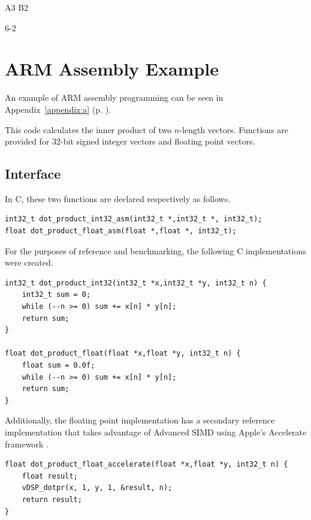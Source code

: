 \documentclass[oneside,a4paper]{report}
\begin{document}
A3
B2

6-2
\chapter{ARM Assembly Example}
An example of ARM assembly programming can be seen in Appendix~\ref{appendix:a} (p. \pageref{appendix:a}).

This code calculates the inner product of two $n$-length vectors. Functions are provided for 32-bit signed integer vectors and floating point vectors.

\section{Interface}

In C, these two functions are declared respectively as follows.

\begin{singlespacing}
\begin{lstlisting}[language={AssemblerC}]
int32_t dot_product_int32_asm(int32_t *,int32_t *, int32_t);
float dot_product_float_asm(float *,float *, int32_t);
\end{lstlisting}
\end{singlespacing}

For the purposes of reference and benchmarking, the following C implementations were created.

\begin{singlespacing}
\begin{lstlisting}[language={AssemblerC}]
int32_t dot_product_int32(int32_t *x,int32_t *y, int32_t n) {
    int32_t sum = 0;
    while (--n >= 0) sum += x[n] * y[n];
    return sum;
}

float dot_product_float(float *x,float *y, int32_t n) {
    float sum = 0.0f;
    while (--n >= 0) sum += x[n] * y[n];
    return sum;
}
\end{lstlisting}
\end{singlespacing}

Additionally, the floating point implementation has a secondary reference implementation that takes advantage of Advanced SIMD using Apple's Accelerate framework \cite{Accelerate}.

\begin{singlespacing}
\begin{lstlisting}[language={AssemblerC}]
float dot_product_float_accelerate(float *x,float *y, int32_t n) {
    float result;
    vDSP_dotpr(x, 1, y, 1, &result, n);
    return result;
}
\end{lstlisting}
\end{singlespacing}
\end{document}
